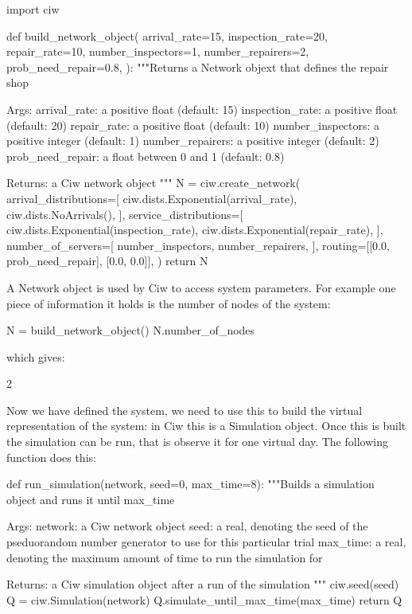 \begin{pyin}
import ciw

def build_network_object(
    arrival_rate=15,
    inspection_rate=20,
    repair_rate=10,
    number_inspectors=1,
    number_repairers=2,
    prob_need_repair=0.8,
):
    """Returns a Network objext that defines the repair shop
    
    Args:
        arrival_rate: a positive float (default: 15)
        inspection_rate: a positive float (default: 20)
        repair_rate: a positive float (default: 10)
        number_inspectors: a positive integer (default: 1)
        number_repairers: a positive integer (default: 2)
        prob_need_repair: a float between 0 and 1 (default: 0.8)
    
    Returns:
        a Ciw network object
    """
    N = ciw.create_network(
        arrival_distributions=[
            ciw.dists.Exponential(arrival_rate),
            ciw.dists.NoArrivals(),
        ],
        service_distributions=[
            ciw.dists.Exponential(inspection_rate),
            ciw.dists.Exponential(repair_rate),
        ],
        number_of_servers=[
            number_inspectors,
            number_repairers,
        ],
        routing=[[0.0, prob_need_repair], [0.0, 0.0]],
    )
    return N
\end{pyin}

A Network object is used by Ciw to access system parameters. For example one
piece of information it holds is the number of nodes of the system:

\begin{pyin}
N = build_network_object()
N.number_of_nodes
\end{pyin}

which gives:

\begin{pyout}
2
\end{pyout}

Now we have defined the system, we need to use this to build the virtual
representation of the system: in Ciw this is a Simulation object.
Once this is built the simulation can be run, that is observe it for one
virtual day. The following function does this:

\begin{pyin}
def run_simulation(network, seed=0, max_time=8):
    """Builds a simulation object and runs it until max_time
    
    Args:
        network: a Ciw network object
        seed: a real, denoting the seed of the pseduorandom
              number generator to use for this particular trial
        max_time: a real, denoting the maximum amount of time
                  to run the simulation for

    Returns:
        a Ciw simulation object after a run of the simulation
    """
    ciw.seed(seed)
    Q = ciw.Simulation(network)
    Q.simulate_until_max_time(max_time)
    return Q
\end{pyin}

